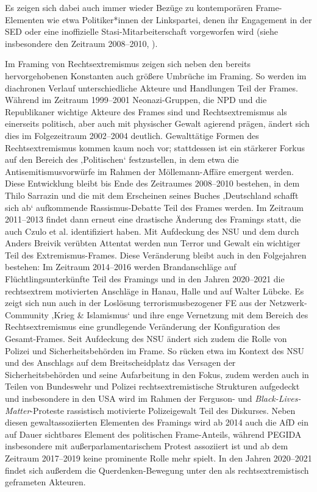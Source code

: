 Es zeigen sich dabei auch immer wieder Bezüge zu kontemporären Frame-Elementen wie etwa Politiker*innen der Linkspartei, denen ihr Engagement in der SED oder eine inoffizielle Stasi-Mitarbeiterschaft vorgeworfen wird (siehe insbesondere den Zeitraum 2008--2010, ).

Im Framing von Rechtsextremismus zeigen sich neben den bereits hervorgehobenen Konstanten auch größere Umbrüche im Framing. So werden im diachronen Verlauf unterschiedliche Akteure und Handlungen Teil der Frames. Während im Zeitraum 1999--2001 Neonazi-Gruppen, die NPD und die Republikaner wichtige Akteure des Frames sind und Rechtsextremismus als einerseits politisch, aber auch mit physischer Gewalt agierend prägen, ändert sich dies im Folgezeitraum 2002--2004 deutlich. Gewalttätige Formen des Rechtsextremismus kommen kaum noch vor; stattdessen ist ein stärkerer Forkus auf den Bereich des ‚Politischen` festzustellen, in dem etwa die Antisemitismusvorwürfe im Rahmen der Möllemann-Affäre emergent werden. Diese Entwicklung bleibt bis Ende des Zeitraumes 2008--2010 bestehen, in dem Thilo Sarrazin und die mit dem Erscheinen seines Buches ‚Deutschland schafft sich ab` aufkommende Rassismus-Debatte Teil des Frames werden. Im Zeitraum 2011--2013 findet dann erneut eine drastische Änderung des Framings statt, die auch Czulo et al. \autocite*{czuloEinflussExtremistischerGewaltereignisse2020} identifiziert haben. Mit Aufdeckung des NSU und dem durch Anders Breivik verübten Attentat werden nun Terror und Gewalt ein wichtiger Teil des Extremismus-Frames. Diese Veränderung bleibt auch in den Folgejahren bestehen: Im Zeitraum 2014--2016 werden Brandanschläge auf Flüchtlingsunterkünfte Teil des Framings und in den Jahren 2020--2021 die rechtsextrem motivierten Anschläge in Hanau, Halle und auf Walter Lübcke. Es zeigt sich nun auch in der Loslösung terrorismusbezogener FE aus der Netzwerk-Community ‚Krieg \& Islamismus` und ihre enge Vernetzung mit dem Bereich des Rechtsextremismus eine grundlegende Veränderung der Konfiguration des Gesamt-Frames. Seit Aufdeckung des NSU ändert sich zudem die Rolle von Polizei und Sicherheitsbehörden im Frame. So rücken etwa im Kontext des NSU und des Anschlags auf dem Breitscheidplatz das Versagen der Sicherheitsbehörden und seine Aufarbeitung in den Fokus, zudem werden auch in Teilen von Bundeswehr und Polizei rechtsextremistische Strukturen aufgedeckt und insbesondere in den USA wird im Rahmen der Ferguson- und \emph{Black-Lives-Matter}-Proteste rassistisch motivierte Polizeigewalt Teil des Diskurses. Neben diesen gewaltassoziierten Elementen des Framings wird ab 2014 auch die AfD ein auf Dauer sichtbares Element des politischen Frame-Anteils, während PEGIDA insbesondere mit außerparlamentarischem Protest assoziiert ist und ab dem Zeitraum 2017--2019 keine prominente Rolle mehr spielt. In den Jahren 2020--2021 findet sich außerdem die Querdenken-Bewegung unter den als rechtsextremistisch geframeten Akteuren.

